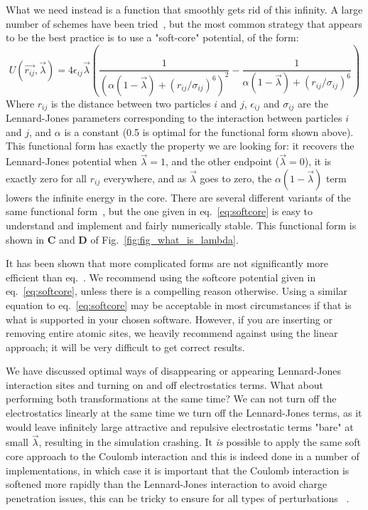 \documentclass[9pt,bestpractices]{livecoms}
\begin{document}
What we need instead is a function that smoothly gets rid of this infinity. A large number of schemes have been tried~\cite{beutler1994avoiding, zacharias1994separationshifted, blondel2004ensemble, pham2011identifying, pham2012optimal, naden2014linear, donnini2005molecular}, but the most common strategy that appears to be the best practice is to use a "soft-core" potential, of the form:
%
\begin{equation}
    U(\vec{r_{ij}},\vec{\lambda}) = 4\epsilon_{ij} \vec{\lambda} \left(\frac{1}{(\alpha(1-\vec{\lambda}) + (r_{ij}/\sigma_{ij})^6)^2} -  \frac{1}{\alpha(1-\vec{\lambda}) + (r_{ij}/\sigma_{ij})^6}\right)
    \label{eq:softcore}
\end{equation}
%
Where $r_{ij}$ is the distance between two particles $i$ and $j$, $\epsilon_{ij}$ and $\sigma_{ij}$ are the Lennard-Jones parameters corresponding to the interaction between particles $i$ and $j$, and $\alpha$ is a constant (0.5 is optimal for the functional form shown above).  This functional form has exactly the property we are looking for: it recovers the Lennard-Jones potential when $\vec{\lambda}=1$, and the other endpoint ($\vec{\lambda}=0$), it is exactly zero for all $r_{ij}$ everywhere, and as $\vec{\lambda}$ goes to zero, the  $\alpha(1-\vec{\lambda})$ term lowers the infinite energy in the core.  There are several different variants of the same functional form~\cite{zacharias1994separationshifted, beutler1994avoiding,pham2011identifying}, but the one  given in eq.~\ref{eq:softcore} is easy to understand and implement and fairly numerically stable. This functional form is shown in \textbf{C} and \textbf{D} of Fig.~\ref{fig:fig_what_is_lambda}.

It has been shown that more complicated forms are not significantly more efficient than eq.~\cite{pham2012optimal}.  We recommend using the softcore potential given in eq.~\ref{eq:softcore}, unless there is a compelling reason otherwise. Using a similar equation to eq.~\ref{eq:softcore} may be acceptable in most circumstances if that is what is supported in your chosen software. However, if you are inserting or removing entire atomic sites, we heavily recommend against using the linear approach; it will be very difficult to get correct results. 

We have discussed optimal ways of disappearing or appearing Lennard-Jones interaction sites and turning on and off electrostatics terms. What about performing both transformations at the same time? We can not turn off the electrostatics linearly at the same time we turn off the Lennard-Jones terms, as it would leave infinitely large attractive and repulsive electrostatic terms "bare" at small $\vec{\lambda}$, resulting in the simulation crashing. It \textit{is} possible to apply the same soft core approach to the Coulomb interaction and this is indeed done in a number of implementations, in which case it is important that the Coulomb interaction is softened more rapidly than the Lennard-Jones interaction to avoid charge penetration issues, this can be tricky to ensure for all types of perturbations ~\cite{steinbrecher2011softcore}. 
\end{document}
